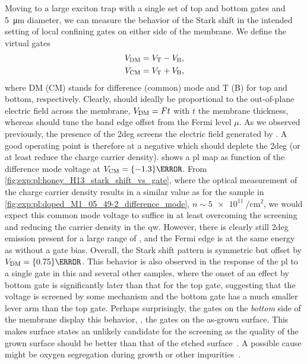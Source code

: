 Moving to a large exciton trap with a single set of top and bottom gates and \qty{5}{\micro\meter} diameter, we can measure the behavior of the Stark shift in the intended setting of local confining gates on either side of the membrane.
We define the virtual gates
\begin{align}\label{eq:exp:observations:virtual_gates}
    V_{\mathrm{DM}} &= V_{\mathrm{T}} - V_{\mathrm{B}}, \\
    V_{\mathrm{CM}} &= V_{\mathrm{T}} + V_{\mathrm{B}},
\end{align}
where DM (CM) stands for difference (common) mode and T (B) for top and bottom, respectively.
Clearly, \VDM should ideally be proportional to the out-of-plane electric field across the membrane, $V_{\mathrm{DM}} = Ft$ with $t$ the membrane thickness, whereas \VCM should tune the band edge offset from the Fermi level $\mu$.
As we observed previously, the presence of the \gls{2deg} screens the electric field generated by \VDM.
A good operating point is therefore at a negative \VCM which should deplete the \gls{2deg} (or at least reduce the charge carrier density).
 shows a \gls{pl} map as function of the difference mode voltage \VDM at $\VCM = \qty{-1.3}{\volt}$.
From \cref{fig:exp:pl:honey_H13_stark_shift_vs_gate}, where the optical measurement of the charge carrier density results in a similar value as for the sample in \cref{fig:exp:pl:doped_M1_05_49-2_difference_mode}, $n\sim\qty{5e11}{\per\centi\meter\squared}$, we would expect this common mode voltage to suffice in at least overcoming the screening and reducing the carrier density in the \gls{qw}.
However, there is clearly still \gls{2deg} emission present for a large range of \VDM, and the Fermi edge is at the same energy as without a gate bias.
Overall, the Stark shift pattern is symmetric but offset by $\VDM = \qty{0.75}{\volt}$.
This behavior is also observed in the response of the \gls{pl} to a single gate in this and several other samples, where the onset of an effect by bottom gate is significantly later than that for the top gate, suggesting that the voltage is screened by some mechanism and the bottom gate has a much smaller lever arm than the top gate.
Perhaps surprisingly, the gates on the \emph{bottom} side of the membrane display this behavior, \ie, the gates on the as-grown surface.
This makes surface states an unlikely candidate for the screening as the quality of the grown surface should be better than that of the etched surface~\cite{Descamps2021}.
A possible cause might be oxygen segregation during growth or other impurities~\cite{Nguyen2020}.

